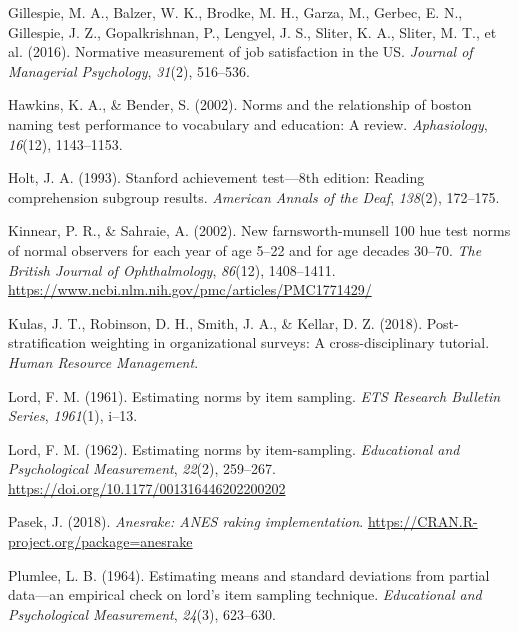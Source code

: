 \documentclass[
  ,man]{apa7}
\newlength{\cslhangindent}
\newlength{\cslentryspacingunit} %
\newenvironment{CSLReferences}[2] %
 {%
  \setlength{\parindent}{0pt}
  \ifodd #1
  \let\oldpar\par
  \def\par{\hangindent=\cslhangindent\oldpar}
  \fi
  \setlength{\parskip}{#2\cslentryspacingunit}
 }%
 {}
\begin{document}
\hypertarget{refs}{}
\begin{CSLReferences}{1}{0}
\leavevmode{}%
Gillespie, M. A., Balzer, W. K., Brodke, M. H., Garza, M., Gerbec, E. N., Gillespie, J. Z., Gopalkrishnan, P., Lengyel, J. S., Sliter, K. A., Sliter, M. T., et al. (2016). Normative measurement of job satisfaction in the US. \emph{Journal of Managerial Psychology}, \emph{31}(2), 516--536.

\leavevmode{}%
Hawkins, K. A., \& Bender, S. (2002). Norms and the relationship of boston naming test performance to vocabulary and education: A review. \emph{Aphasiology}, \emph{16}(12), 1143--1153.

\leavevmode{}%
Holt, J. A. (1993). Stanford achievement test---8th edition: Reading comprehension subgroup results. \emph{American Annals of the Deaf}, \emph{138}(2), 172--175.

\leavevmode{}%
Kinnear, P. R., \& Sahraie, A. (2002). New farnsworth-munsell 100 hue test norms of normal observers for each year of age 5--22 and for age decades 30--70. \emph{The British Journal of Ophthalmology}, \emph{86}(12), 1408--1411. \url{https://www.ncbi.nlm.nih.gov/pmc/articles/PMC1771429/}

\leavevmode{}%
Kulas, J. T., Robinson, D. H., Smith, J. A., \& Kellar, D. Z. (2018). Post-stratification weighting in organizational surveys: A cross-disciplinary tutorial. \emph{Human Resource Management}.

\leavevmode{}%
Lord, F. M. (1961). Estimating norms by item sampling. \emph{ETS Research Bulletin Series}, \emph{1961}(1), i--13.

\leavevmode{}%
Lord, F. M. (1962). Estimating norms by item-sampling. \emph{Educational and Psychological Measurement}, \emph{22}(2), 259--267. \url{https://doi.org/10.1177/001316446202200202}

\leavevmode{}%
Pasek, J. (2018). \emph{Anesrake: ANES raking implementation}. \url{https://CRAN.R-project.org/package=anesrake}

\leavevmode{}%
Plumlee, L. B. (1964). Estimating means and standard deviations from partial data---an empirical check on lord's item sampling technique. \emph{Educational and Psychological Measurement}, \emph{24}(3), 623--630.


\end{CSLReferences}
\end{document}
